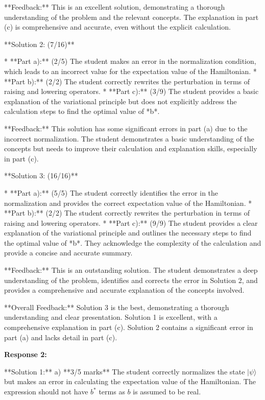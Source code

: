 \documentclass[a4paper,11pt]{article}
\begin{document}
**Feedback:** This is an excellent solution, demonstrating a thorough understanding of the problem and the relevant concepts. The explanation in part (c) is comprehensive and accurate, even without the explicit calculation.

**Solution 2: (7/16)**

*   **Part a):** (2/5) The student makes an error in the normalization condition, which leads to an incorrect value for the expectation value of the Hamiltonian.
*   **Part b):** (2/2) The student correctly rewrites the perturbation in terms of raising and lowering operators.
*   **Part c):** (3/9) The student provides a basic explanation of the variational principle but does not explicitly address the calculation steps to find the optimal value of *b*.

**Feedback:** This solution has some significant errors in part (a) due to the incorrect normalization. The student demonstrates a basic understanding of the concepts but needs to improve their calculation and explanation skills, especially in part (c).

**Solution 3: (16/16)**

*   **Part a):** (5/5) The student correctly identifies the error in the normalization and provides the correct expectation value of the Hamiltonian.
*   **Part b):** (2/2) The student correctly rewrites the perturbation in terms of raising and lowering operators.
*   **Part c):** (9/9) The student provides a clear explanation of the variational principle and outlines the necessary steps to find the optimal value of *b*. They acknowledge the complexity of the calculation and provide a concise and accurate summary.

**Feedback:** This is an outstanding solution. The student demonstrates a deep understanding of the problem, identifies and corrects the error in Solution 2, and provides a comprehensive and accurate explanation of the concepts involved.

**Overall Feedback:**
Solution 3 is the best, demonstrating a thorough understanding and clear presentation. Solution 1 is excellent, with a comprehensive explanation in part (c). Solution 2 contains a significant error in part (a) and lacks detail in part (c).

\textbf{Response 2:}

**Solution 1:**
a) **3/5 marks**
The student correctly normalizes the state \(|\psi\rangle\) but makes an error in calculating the expectation value of the Hamiltonian. The expression should not have \(b^*\) terms as \(b\) is assumed to be real.
\end{document}
